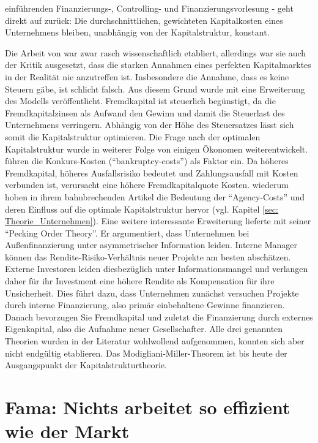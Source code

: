 einführenden Finanzierungs-, Controlling- und Finanzierungsvorlesung - geht direkt auf \textcite{Modigliani1958} zurück: Die durchschnittlichen, gewichteten Kapitalkosten eines Unternehmens bleiben, unabhängig von der Kapitalstruktur, konstant.

Die Arbeit von \textcite{Modigliani1958} war zwar rasch wissenschaftlich etabliert, allerdings war sie auch der Kritik ausgesetzt, dass die starken Annahmen eines perfekten Kapitalmarktes in der Realität nie anzutreffen ist. Insbesondere die Annahme, dass es keine Steuern gäbe, ist schlicht falsch. Aus diesem Grund wurde mit \textcite{Modigliani1963} eine Erweiterung des Modells veröffentlicht. Fremdkapital ist steuerlich begünstigt, da die Fremdkapitalzinsen als Aufwand den Gewinn und damit die Steuerlast des Unternehmens verringern. Abhängig von der Höhe des Steuersatzes lässt sich somit die Kapitalstruktur optimieren. Die Frage nach der optimalen Kapitalstruktur wurde in weiterer Folge von einigen Ökonomen weiterentwickelt. \textcite{Kraus1973} führen die Konkurs-Kosten ("`bankruptcy-costs"') als Faktor ein. Da höheres Fremdkapital, höheres Ausfallsrisiko bedeutet und Zahlungsausfall mit Kosten verbunden ist, verursacht eine höhere Fremdkapitalquote Kosten. \textcite{Jensen1976} wiederum hoben in ihrem bahnbrechenden Artikel die Bedeutung der "`Agency-Costs"' und deren Einfluss auf die optimale Kapitalstruktur hervor (vgl. Kapitel \ref{sec: Theorie_Unternehmen}). Eine weitere interessante Erweiterung lieferte \textcite{Myers1984} mit seiner "`Pecking Order Theory"'. Er argumentiert, dass Unternehmen bei Außenfinanzierung unter asymmetrischer Information leiden. Interne Manager können das Rendite-Risiko-Verhältnis neuer Projekte am besten abschätzen. Externe Investoren leiden diesbezüglich unter Informationsmangel und verlangen daher für ihr Investment eine höhere Rendite als Kompensation für ihre Unsicherheit. Dies führt dazu, dass Unternehmen zunächst versuchen Projekte durch interne Finanzierung, also primär einbehaltene Gewinne finanzieren. Danach bevorzugen Sie Fremdkapital und zuletzt die Finanzierung durch externes Eigenkapital, also die Aufnahme neuer Gesellschafter. Alle drei genannten Theorien wurden in der Literatur wohlwollend aufgenommen, konnten sich aber nicht endgültig etablieren. Das Modigliani-Miller-Theorem ist bis heute der Ausgangspunkt der Kapitalstrukturtheorie. 

\section{Fama: Nichts arbeitet so effizient wie der Markt}
\label{Efficient}

